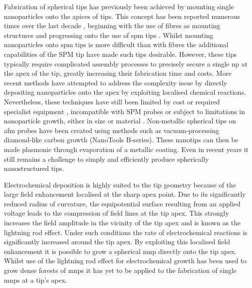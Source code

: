 \documentclass[12pt, a4paper, oneside]{book}
\begin{document}
Fabrication of spherical tips has previously been achieved by mounting single nanoparticles onto the apices of tips. This concept has been reported numerous times over the last decade \cite{gan2007}, beginning with the use of fibres as mounting structures \cite{kalkbrenner2001, barsegova2002, sqalli2002, kawata2003} and progressing onto the use of \gls{spm} tips \cite{umakoshi2012, hayazawa2012, park2012, okamoto2001, vakarelski2006}. Whilst mounting nanoparticles onto \gls{spm} tips is more difficult than with fibres the additional capabilities of the SPM tip have made such tips desirable. However, these tips typically require complicated assembly processes to precisely secure a single \gls{np} at the apex of the tip, greatly increasing their fabrication time and costs. More recent methods have attempted to address the complexity issue by directly depositing nanoparticles onto the apex by exploiting localised chemical reactions. Nevertheless, these techniques have still been limited by cost or required specialist equipment \cite{sqalli2002, okamoto2001}, incompatible with SPM probes \cite{kharintsev2013, barsegova2002} or subject to limitations in nanoparticle growth, either in size \cite{cheng2013} or material \cite{umakoshi2012}.
Non-metallic spherical tips on \gls{afm} probes have been created using methods such as vacuum-processing diamond-like carbon growth (NanoTools B-series). These nanotips can then be made plasmonic through evaporation of a metallic coating.
Even in recent years it still remains a challenge to simply and efficiently produce spherically nanostructured tips.

Electrochemical deposition is highly suited to the tip geometry because of the large field enhancement localised at the sharp apex point. Due to its significantly reduced radius of curvature, the equipotential surface resulting from an applied voltage leads to the compression of field lines at the tip apex. This strongly increases the field amplitude in the vicinity of the tip apex and is known as the lightning rod effect. Under such conditions the rate of electrochemical reactions is significantly increased around the tip apex. By exploiting this localised field enhancement it is possible to grow a spherical \gls{mnp} directly onto the tip apex. Whilst use of the lightning rod effect for electrochemical growth has been used to grow dense forests of \glspl{mnp} \cite{tian2006, yang2011} it has yet to be applied to the fabrication of single \glspl{mnp} at a tip's apex.
\end{document}

